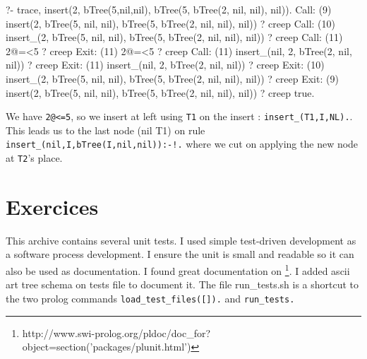 \documentclass{article}
\begin{document}
    \begin{myminted}
    ?- trace, insert(2, bTree(5,nil,nil), bTree(5, bTree(2, nil, nil), nil)).
   Call: (9) insert(2, bTree(5, nil, nil), bTree(5, bTree(2, nil, nil), nil)) ? creep
   Call: (10) insert_(2, bTree(5, nil, nil), bTree(5, bTree(2, nil, nil), nil)) ? creep
   Call: (11) 2@=<5 ? creep
   Exit: (11) 2@=<5 ? creep
   Call: (11) insert_(nil, 2, bTree(2, nil, nil)) ? creep
   Exit: (11) insert_(nil, 2, bTree(2, nil, nil)) ? creep
   Exit: (10) insert_(2, bTree(5, nil, nil), bTree(5, bTree(2, nil, nil), nil)) ? creep
   Exit: (9) insert(2, bTree(5, nil, nil), bTree(5, bTree(2, nil, nil), nil)) ? creep
true.
    \end{myminted}

    We have \texttt{2@<=5}, so we insert at left using \texttt{T1}
    on the insert : \texttt{insert_(T1,I,NL).}. This leads us to the
    last node (nil T1) on rule \texttt{insert_(nil,I,bTree(I,nil,nil)):-!.} where
    we cut on applying the new node at \texttt{T2}'s place.

\section*{Exercices}

  This archive contains several unit tests. I used simple test-driven development as a
  software process development. I ensure the unit is small and readable so it can also
  be used as documentation. I found great documentation on
  \footnote{http://www.swi-prolog.org/pldoc/doc\_for?object=section('packages/plunit.html')}.
  I added ascii art tree schema on tests file to document it. The file run\_tests.sh
  is a shortcut to the two prolog commands \texttt{load_test_files([]).} and \texttt{run_tests.}
\end{document}
